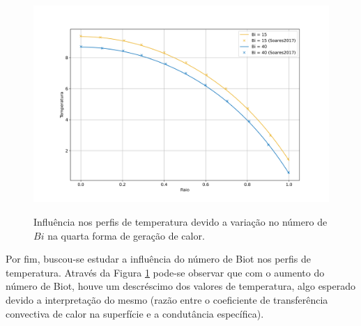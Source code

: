\begin{figure}[H]
    \centering
    \caption{Influência nos perfis de temperatura devido a variação no número de \(Bi\) na quarta forma de geração de calor.}
    \includegraphics[scale=0.5]{figures/results/Fig15.png}
    \label{fig:influence_of_Biot_on_fourth_heat_generation}
\end{figure}

Por fim, buscou-se estudar a influência do número de Biot nos perfis de temperatura. Através da Figura \ref{fig:influence_of_Biot_on_fourth_heat_generation} pode-se observar que com o aumento do número de Biot, houve um descréscimo dos valores de temperatura, algo esperado devido a interpretação do mesmo (razão entre o coeficiente de transferência convectiva de calor na superfície e a condutância específica).
